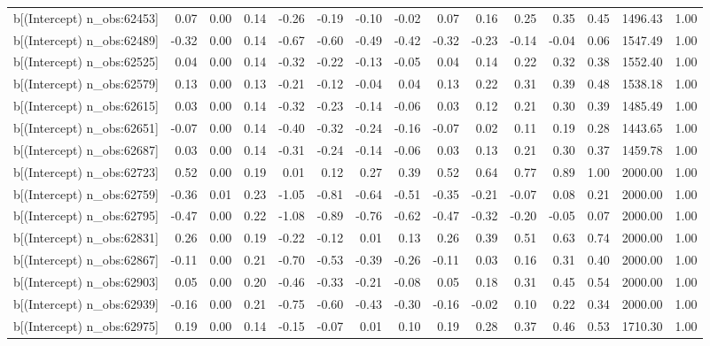 \begin{table}[ht]
\begin{tabular}{rrrrrrrrrrrrrrr}
  b[(Intercept) n\_obs:62453] & 0.07 & 0.00 & 0.14 & -0.26 & -0.19 & -0.10 & -0.02 & 0.07 & 0.16 & 0.25 & 0.35 & 0.45 & 1496.43 & 1.00 \\ 
  b[(Intercept) n\_obs:62489] & -0.32 & 0.00 & 0.14 & -0.67 & -0.60 & -0.49 & -0.42 & -0.32 & -0.23 & -0.14 & -0.04 & 0.06 & 1547.49 & 1.00 \\ 
  b[(Intercept) n\_obs:62525] & 0.04 & 0.00 & 0.14 & -0.32 & -0.22 & -0.13 & -0.05 & 0.04 & 0.14 & 0.22 & 0.32 & 0.38 & 1552.40 & 1.00 \\ 
  b[(Intercept) n\_obs:62579] & 0.13 & 0.00 & 0.13 & -0.21 & -0.12 & -0.04 & 0.04 & 0.13 & 0.22 & 0.31 & 0.39 & 0.48 & 1538.18 & 1.00 \\ 
  b[(Intercept) n\_obs:62615] & 0.03 & 0.00 & 0.14 & -0.32 & -0.23 & -0.14 & -0.06 & 0.03 & 0.12 & 0.21 & 0.30 & 0.39 & 1485.49 & 1.00 \\ 
  b[(Intercept) n\_obs:62651] & -0.07 & 0.00 & 0.14 & -0.40 & -0.32 & -0.24 & -0.16 & -0.07 & 0.02 & 0.11 & 0.19 & 0.28 & 1443.65 & 1.00 \\ 
  b[(Intercept) n\_obs:62687] & 0.03 & 0.00 & 0.14 & -0.31 & -0.24 & -0.14 & -0.06 & 0.03 & 0.13 & 0.21 & 0.30 & 0.37 & 1459.78 & 1.00 \\ 
  b[(Intercept) n\_obs:62723] & 0.52 & 0.00 & 0.19 & 0.01 & 0.12 & 0.27 & 0.39 & 0.52 & 0.64 & 0.77 & 0.89 & 1.00 & 2000.00 & 1.00 \\ 
  b[(Intercept) n\_obs:62759] & -0.36 & 0.01 & 0.23 & -1.05 & -0.81 & -0.64 & -0.51 & -0.35 & -0.21 & -0.07 & 0.08 & 0.21 & 2000.00 & 1.00 \\ 
  b[(Intercept) n\_obs:62795] & -0.47 & 0.00 & 0.22 & -1.08 & -0.89 & -0.76 & -0.62 & -0.47 & -0.32 & -0.20 & -0.05 & 0.07 & 2000.00 & 1.00 \\ 
  b[(Intercept) n\_obs:62831] & 0.26 & 0.00 & 0.19 & -0.22 & -0.12 & 0.01 & 0.13 & 0.26 & 0.39 & 0.51 & 0.63 & 0.74 & 2000.00 & 1.00 \\ 
  b[(Intercept) n\_obs:62867] & -0.11 & 0.00 & 0.21 & -0.70 & -0.53 & -0.39 & -0.26 & -0.11 & 0.03 & 0.16 & 0.31 & 0.40 & 2000.00 & 1.00 \\ 
  b[(Intercept) n\_obs:62903] & 0.05 & 0.00 & 0.20 & -0.46 & -0.33 & -0.21 & -0.08 & 0.05 & 0.18 & 0.31 & 0.45 & 0.54 & 2000.00 & 1.00 \\ 
  b[(Intercept) n\_obs:62939] & -0.16 & 0.00 & 0.21 & -0.75 & -0.60 & -0.43 & -0.30 & -0.16 & -0.02 & 0.10 & 0.22 & 0.34 & 2000.00 & 1.00 \\ 
  b[(Intercept) n\_obs:62975] & 0.19 & 0.00 & 0.14 & -0.15 & -0.07 & 0.01 & 0.10 & 0.19 & 0.28 & 0.37 & 0.46 & 0.53 & 1710.30 & 1.00 \\ 

\end{tabular}
\end{table}
